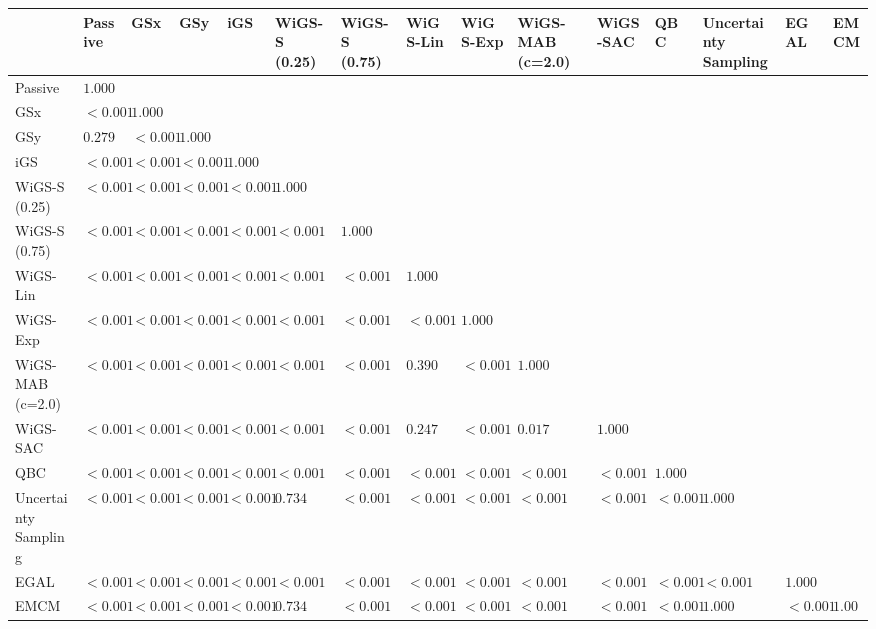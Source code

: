 \begin{tabular}{lllllllllllllll}
\toprule
 & Passive & GSx & GSy & iGS & WiGS-S (0.25) & WiGS-S (0.75) & WiGS-Lin & WiGS-Exp & WiGS-MAB (c=2.0) & WiGS-SAC & QBC & Uncertainty Sampling & EGAL & EMCM \\
\midrule
Passive & $1.000$ &  &  &  &  &  &  &  &  &  &  &  &  &  \\
GSx & $<0.001$ & $1.000$ &  &  &  &  &  &  &  &  &  &  &  &  \\
GSy & $0.279$ & $<0.001$ & $1.000$ &  &  &  &  &  &  &  &  &  &  &  \\
iGS & $<0.001$ & $<0.001$ & $<0.001$ & $1.000$ &  &  &  &  &  &  &  &  &  &  \\
WiGS-S (0.25) & $<0.001$ & $<0.001$ & $<0.001$ & $<0.001$ & $1.000$ &  &  &  &  &  &  &  &  &  \\
WiGS-S (0.75) & $<0.001$ & $<0.001$ & $<0.001$ & $<0.001$ & $<0.001$ & $1.000$ &  &  &  &  &  &  &  &  \\
WiGS-Lin & $<0.001$ & $<0.001$ & $<0.001$ & $<0.001$ & $<0.001$ & $<0.001$ & $1.000$ &  &  &  &  &  &  &  \\
WiGS-Exp & $<0.001$ & $<0.001$ & $<0.001$ & $<0.001$ & $<0.001$ & $<0.001$ & $<0.001$ & $1.000$ &  &  &  &  &  &  \\
WiGS-MAB (c=2.0) & $<0.001$ & $<0.001$ & $<0.001$ & $<0.001$ & $<0.001$ & $<0.001$ & $0.390$ & $<0.001$ & $1.000$ &  &  &  &  &  \\
WiGS-SAC & $<0.001$ & $<0.001$ & $<0.001$ & $<0.001$ & $<0.001$ & $<0.001$ & $0.247$ & $<0.001$ & $0.017$ & $1.000$ &  &  &  &  \\
QBC & $<0.001$ & $<0.001$ & $<0.001$ & $<0.001$ & $<0.001$ & $<0.001$ & $<0.001$ & $<0.001$ & $<0.001$ & $<0.001$ & $1.000$ &  &  &  \\
Uncertainty Sampling & $<0.001$ & $<0.001$ & $<0.001$ & $<0.001$ & $0.734$ & $<0.001$ & $<0.001$ & $<0.001$ & $<0.001$ & $<0.001$ & $<0.001$ & $1.000$ &  &  \\
EGAL & $<0.001$ & $<0.001$ & $<0.001$ & $<0.001$ & $<0.001$ & $<0.001$ & $<0.001$ & $<0.001$ & $<0.001$ & $<0.001$ & $<0.001$ & $<0.001$ & $1.000$ &  \\
EMCM & $<0.001$ & $<0.001$ & $<0.001$ & $<0.001$ & $0.734$ & $<0.001$ & $<0.001$ & $<0.001$ & $<0.001$ & $<0.001$ & $<0.001$ & $1.000$ & $<0.001$ & $1.000$ \\
\bottomrule
\end{tabular}
